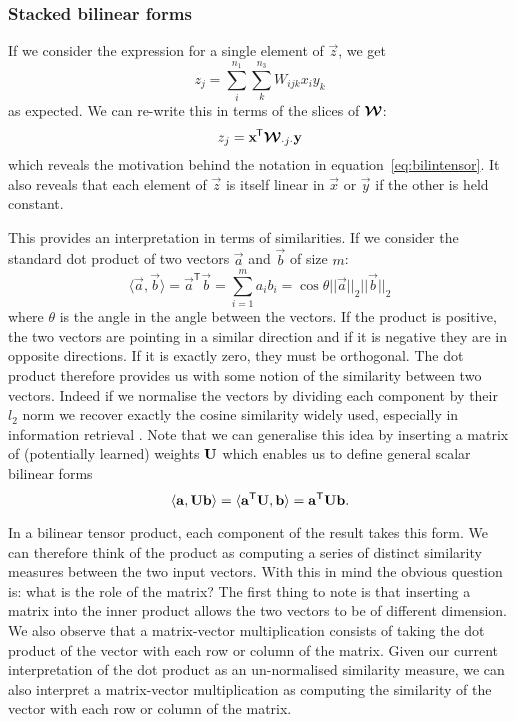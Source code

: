 \subsubsection{Stacked bilinear forms}
If we consider the expression for a single element of \(\vec{z}\), we get
\begin{equation} \label{eq:singlezsum}
	z_j = \sum_i^{n_1} \sum_k^{n_3} W_{ijk} x_i y_k
\end{equation} as expected. We can re-write this in terms of the slices of \(\bm{\mathcal{W}}\):
\begin{equation}\label{eq:singlezslice}
	z_j = \mathbf{x}^{\mkern-1.5mu\mathsf{T}}\bm{\mathcal{W}}_{\cdot j \cdot}\mathbf{y}
\end{equation} which reveals the motivation behind the notation in equation~\eqref{eq:bilintensor}.
It also reveals that each element of \(\vec{z}\) is itself linear in \(\vec{x}\) or \(\vec{y}\) if
the other is held constant.

This provides an interpretation
in terms of similarities. If we consider the standard dot product of two vectors 
\(\vec{a}\) and
\(\vec{b}\) of size \(m\): 
\begin{equation}
\langle\vec{a}, \vec{b}\rangle = 
\vec{a}^\mathsf{T}\vec{b}
= \sum_{i=1}^ma_ib_i
 = {\cos\theta}{||\vec{a}||_2||\vec{b}||_2} 
\end{equation} where
\(\theta\) is the angle in the angle between the vectors. If the product
is positive, the two vectors are pointing in a similar direction and if it is negative they
are in opposite directions. If it is exactly zero, they must be orthogonal. The dot product
therefore provides us with some notion of the similarity between two vectors.
Indeed if we normalise the vectors by dividing each component by their \(l_2\) norm we
recover exactly the cosine similarity widely used, especially in information retrieval 
\autocite{Singhal2001, Tan2006} . Note that
we can generalise this idea by inserting a matrix of (potentially learned)
weights \(\mathbf{U}\) which enables us
to define general scalar bilinear forms
\begin{equation}
	\langle\mathbf{a}, \mathbf{U}\mathbf{b}\rangle = \langle\mathbf{a}^\mathsf{T}\mathbf{U}, \mathbf{b}\rangle
	= \mathbf{a}^\mathsf{T}\mathbf{U}\mathbf{b}.
\end{equation}

In a bilinear tensor product, each component of the result takes this form.
We can therefore think of the
product as computing a series of distinct similarity measures between the two input
vectors. With this in mind the obvious question is: what is the role of the matrix? The first
thing to note is that inserting a matrix into the inner product allows the two vectors to be
of different dimension. We also observe that a matrix-vector multiplication consists of
taking the dot product of the vector with each row or column of the matrix. Given our current
interpretation of the dot product as an un-normalised similarity measure, we can also
interpret a matrix-vector multiplication as computing the similarity of the vector with each
row or column of the matrix. 

